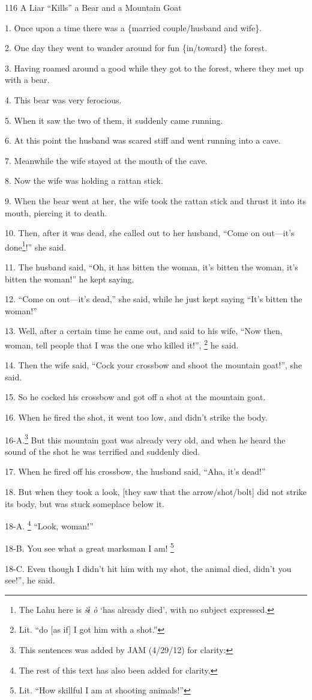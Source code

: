 
116 A Liar ``Kills'' a Bear and a Mountain Goat

1. Once upon a time there was a \{married couple/husband and wife\}.

2. One day they went to wander around for fun \{in/toward\} the forest.

3. Having roamed around a good while they got to the forest, where they met up
with a bear.

4. This bear was very ferocious.

5. When it saw the two of them, it suddenly came running.

6. At this point the husband was scared stiff and went running into a cave.

7. Meanwhile the wife stayed at the mouth of the cave.

8. Now the wife was holding a rattan stick.

9. When the bear went at her, the wife took the rattan stick and thrust it into
its mouth, piercing it to death.

10. Then, after it was dead, she called out to her husband, ``Come on out---it's
done\footnote{The Lahu here is \textit{šɨ ò} `has already died', with no subject expressed.}!'' she said.

11. The husband said, ``Oh, it has bitten the woman, it's bitten the woman, it's
bitten the woman!'' he kept saying.

12. ``Come on out---it's dead,'' she said, while he just kept saying ``It's bitten
the woman!''

13. Well, after a certain time he came out, and said to his wife, ``Now then, woman,
tell people that I was the one who killed it!'', \footnote{Lit. ``do [as if] I got him with a shot.''} he said.

14. Then the wife said, ``Cock your crossbow and shoot the mountain goat!'', she
said.

15. So he cocked his crossbow and got off a shot at the mountain goat.

16. When he fired the shot, it went too low, and didn't strike the body.

16-A.\footnote{This sentences was added by JAM (4/29/12) for clarity:} But this mountain goat was already very old, and when he heard the sound
of the shot he was terrified and suddenly died.

17. When he fired off his crossbow, the husband said, ``Aha, it's dead!''

18. But when they took a look, [they saw that the arrow/shot/bolt] did not strike
its body, but was stuck someplace below it.

18-A. \footnote{The rest of this text has also been added for clarity.} ``Look, woman!''

18-B. You see what a great marksman I am! \footnote{Lit. ``How skillful I am at shooting animals!''}

18-C. Even though I didn't hit him with my shot, the animal died, didn't you see!'',
he said.

